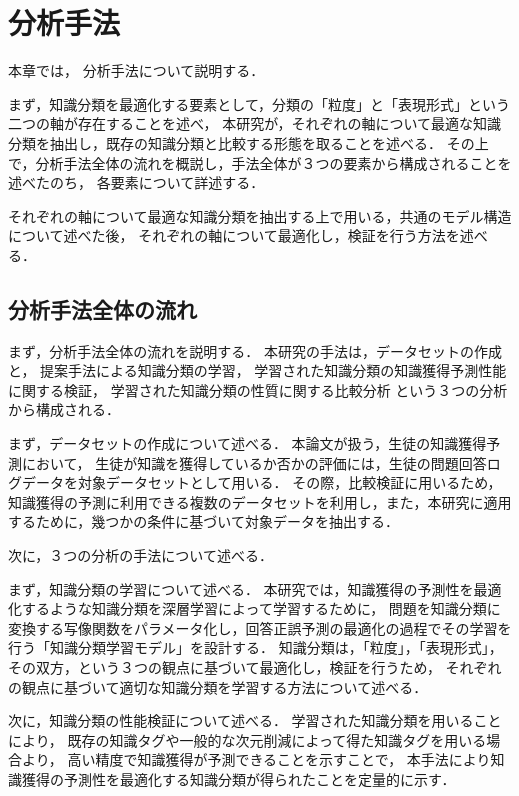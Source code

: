 \chapter{分析手法}
\label{chap:method}
\fancyhf{}
\rhead{\thepage}
\cfoot{\thepage}
本章では，
分析手法について説明する．

まず，知識分類を最適化する要素として，分類の「粒度」と「表現形式」という二つの軸が存在することを述べ，
本研究が，それぞれの軸について最適な知識分類を抽出し，既存の知識分類と比較する形態を取ることを述べる．
その上で，分析手法全体の流れを概説し，手法全体が３つの要素から構成されることを述べたのち，
各要素について詳述する．

それぞれの軸について最適な知識分類を抽出する上で用いる，共通のモデル構造について述べた後，
それぞれの軸について最適化し，検証を行う方法を述べる．

\vvspace


\section{分析手法全体の流れ}
まず，分析手法全体の流れを説明する．
本研究の手法は，データセットの作成と，
提案手法による知識分類の学習，
学習された知識分類の知識獲得予測性能に関する検証，
学習された知識分類の性質に関する比較分析
という３つの分析から構成される．

まず，データセットの作成について述べる．
本論文が扱う，生徒の知識獲得予測において，
生徒が知識を獲得しているか否かの評価には，生徒の問題回答ログデータを対象データセットとして用いる．
その際，比較検証に用いるため，
知識獲得の予測に利用できる複数のデータセットを利用し，また，本研究に適用するために，幾つかの条件に基づいて対象データを抽出する．


次に，３つの分析の手法について述べる．

まず，知識分類の学習について述べる．
本研究では，知識獲得の予測性を最適化するような知識分類を深層学習によって学習するために，
問題を知識分類に変換する写像関数をパラメータ化し，回答正誤予測の最適化の過程でその学習を行う「知識分類学習モデル」を設計する．
知識分類は，「粒度」，「表現形式」，その双方，という３つの観点に基づいて最適化し，検証を行うため，
それぞれの観点に基づいて適切な知識分類を学習する方法について述べる．

次に，知識分類の性能検証について述べる．
学習された知識分類を用いることにより，
既存の知識タグや一般的な次元削減によって得た知識タグを用いる場合より，
高い精度で知識獲得が予測できることを示すことで，
本手法により知識獲得の予測性を最適化する知識分類が得られたことを定量的に示す．

